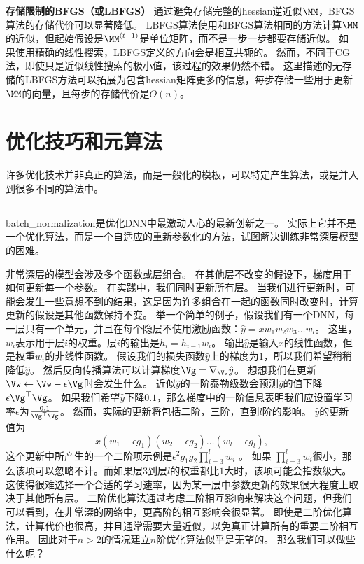 \textbf{存储限制的\gls{BFGS}（或\gls{LBFGS}）}
通过避免存储完整的\gls{hessian}逆近似$\MM$，\gls{BFGS}算法的存储代价可以显著降低。
\gls{LBFGS}算法使用和\gls{BFGS}算法相同的方法计算$\MM$的近似，但起始假设是$\MM^{(t-1)}$是单位矩阵，而不是一步一步都要存储近似。
如果使用精确的线性搜索，\gls{LBFGS}定义的方向会是相互共轭的。
然而，不同于\gls{CG}法，即使只是近似线性搜索的极小值，该过程的效果仍然不错。
这里描述的无存储的\gls{LBFGS}方法可以拓展为包含\gls{hessian}矩阵更多的信息，每步存储一些用于更新$\MM$的向量，且每步的存储代价是$O(n)$。


\section{优化技巧和元算法}
\label{sec:optimization_strategies_and_meta_algorithms}
许多优化技术并非真正的算法，而是一般化的模板，可以特定产生算法，或是并入到很多不同的算法中。

\subsection{}
\label{sec:batch_normalization}
\gls{batch_normalization}\citep{Ioffe+Szegedy-2015}是优化\gls{DNN}中最激动人心的最新创新之一。
实际上它并不是一个优化算法，而是一个自适应的重新参数化的方法，试图解决训练非常深层模型的困难。

非常深层的模型会涉及多个函数或层组合。
在其他层不改变的假设下，梯度用于如何更新每一个参数。
在实践中，我们同时更新所有层。
当我们进行更新时，可能会发生一些意想不到的结果，这是因为许多组合在一起的函数同时改变时，计算更新的假设是其他函数保持不变。
举一个简单的例子，假设我们有一个\gls{DNN}，每一层只有一个单元，并且在每个隐层不使用激励函数：$\hat{y} = xw_1 w_2 w_3 \dots w_l$。
这里，$w_i$表示用于层$i$的权重。层$i$的输出是$h_i = h_{i-1} w_i$。
输出$\hat{y}$是输入$x$的线性函数，但是权重$w_i$的非线性函数。
假设我们的损失函数$\hat{y}$上的梯度为$1$，所以我们希望稍稍降低$\hat{y}$。
然后反向传播算法可以计算梯度$\Vg = \nabla_{\Vw} \hat{y}$。
想想我们在更新$\Vw \leftarrow \Vw - \epsilon \Vg$时会发生什么。
近似$\hat{y}$的一阶泰勒级数会预测$\hat{y}$的值下降$\epsilon \Vg^\top \Vg$。
如果我们希望$\hat{y}$下降$0.1$，那么梯度中的一阶信息表明我们应设置学习率$\epsilon$为$\frac{0.1}{\Vg^\top \Vg}$。
然而，实际的更新将包括二阶，三阶，直到$l$阶的影响。
$\hat{y}$的更新值为
\begin{equation}
    x(w_1-\epsilon g_1)(w_2-\epsilon g_2)\dots(w_l-\epsilon g_l),
\end{equation}
这个更新中所产生的一个二阶项示例是$\epsilon^2 g_1 g_2 \prod_{i=3}^l w_i$ 。
如果 $\prod_{i=3}^l w_i$很小，那么该项可以忽略不计。而如果层$3$到层$l$的权重都比$1$大时，该项可能会指数级大。
这使得很难选择一个合适的学习速率，因为某一层中参数更新的效果很大程度上取决于其他所有层。
二阶优化算法通过考虑二阶相互影响来解决这个问题，但我们可以看到，在非常深的网络中，更高阶的相互影响会很显著。
即使是二阶优化算法，计算代价也很高，并且通常需要大量近似，以免真正计算所有的重要二阶相互作用。
因此对于$n>2$的情况建立$n$阶优化算法似乎是无望的。
那么我们可以做些什么呢？

